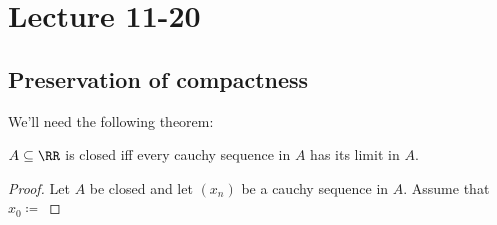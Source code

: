 \documentclass[class=scrartcl, crop=false]{standalone}
\date{2019-11-20}
\begin{document}
\section{Lecture 11-20}

\subsection{Preservation of compactness}

We'll need the following theorem:

$A \subseteq \RR$ is closed iff every cauchy sequence in $A$ has its limit in $A$.

\begin{proof}
  Let $A$ be closed and let $(x_n)$ be a cauchy sequence in $A$. Assume that $x_0 \coloneqq$
\end{proof} 
\end{document}
